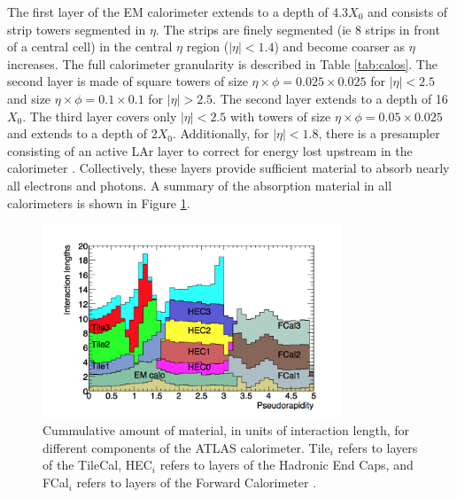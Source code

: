 The first layer of the EM calorimeter extends to a depth of 4.3$X_0$ and consists of strip towers segmented in $\eta$. The strips are finely segmented (ie 8 strips in front of a central cell) in the central $\eta$ region ($|\eta|<1.4$) and become coarser as $\eta$ increases. The full calorimeter granularity is described in Table \ref{tab:calos}. The second layer is made of square towers of size $\eta \times \phi=0.025\times0.025$ for $|\eta|<2.5$ and size $\eta \times \phi = 0.1 \times 0.1$ for $|\eta|>2.5$. The second layer extends to a depth of 16$X_0$. The third layer covers only $|\eta|<2.5$ with towers of size $\eta \times \phi = 0.05 \times 0.025$ and extends to a depth of 2$X_0$. Additionally, for $|\eta|<1.8$, there is a presampler consisting of an active LAr layer to correct for energy lost upstream in the calorimeter \cite{atlas}. Collectively, these layers provide sufficient material to absorb nearly all electrons and photons. A summary of the absorption material in all calorimeters is shown in Figure \ref{fig:int_lens}.\\

\begin{figure}[htb!]
    \centering
    \includegraphics[width=3.5in]{figures/chapter2/calo_int_lens.png}
    \caption{Cummulative amount of material, in units of interaction length, for different components of the ATLAS calorimeter. Tile$_i$ refers to layers of the TileCal, HEC$_i$ refers to layers of the Hadronic End Caps, and FCal$_i$ refers to layers of the Forward Calorimeter \cite{atlas}.}
    \label{fig:int_lens}
\end{figure}

